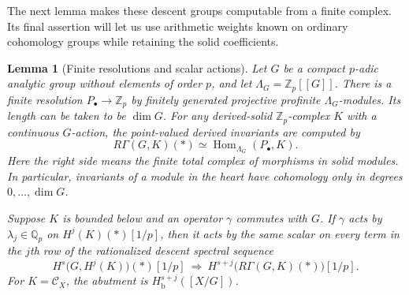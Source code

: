 \documentclass[11pt]{article}
\numberwithin{equation}{section}
\newtheorem{lemma}[theorem]{Lemma}
\theoremstyle{definition}
\theoremstyle{remark}
\newcommand{\Q}{\mathbb Q}
\newcommand{\Z}{\mathbb Z}
\DeclareMathOperator{\Hom}{Hom}
\begin{document}
The next lemma makes these descent groups computable from a finite
complex. Its final assertion will let us use arithmetic weights known
on ordinary cohomology groups while retaining the solid coefficients.

\begin{lemma}[Finite resolutions and scalar actions]
\label{lem:solid-resolutions}
Let $G$ be a compact $p$-adic analytic group without elements of order
$p$, and let $\Lambda_G=\Z_p[[G]]$.  There is a finite resolution
$P_\bullet\to\Z_p$ by finitely generated projective profinite
$\Lambda_G$-modules.  Its length can be taken to be $\dim G$.
For any derived-solid $\Z_p$-complex $K$ with a continuous $G$-action,
the point-valued derived invariants are computed by
\begin{equation}
\label{eq:finite-resolution}
 R\Gamma(G,K)(*)\simeq
 \Hom_{\Lambda_G}(P_\bullet,K).
\end{equation}
Here the right side means the finite total complex of morphisms in
solid modules.  In particular, invariants of a module in the heart
have cohomology only in degrees $0,\ldots,\dim G$.

Suppose $K$ is bounded below and an operator $\gamma$ commutes with
$G$.  If $\gamma$ acts by $\lambda_j\in\Q_p$ on $H^j(K)(*)[1/p]$,
then it acts by the same scalar on every term in the $j$th row of
the rationalized descent spectral sequence
\[
 H^s\bigl(G,H^j(K)\bigr)(*)[1/p]
       \ \Longrightarrow\ H^{s+j}\bigl(R\Gamma(G,K)(*)\bigr)[1/p].
\]
For $K=\mathscr C_X$, the abutment is $H^{s+j}_{\mathrm b}([X/G])$.
\end{lemma}
\end{document}
